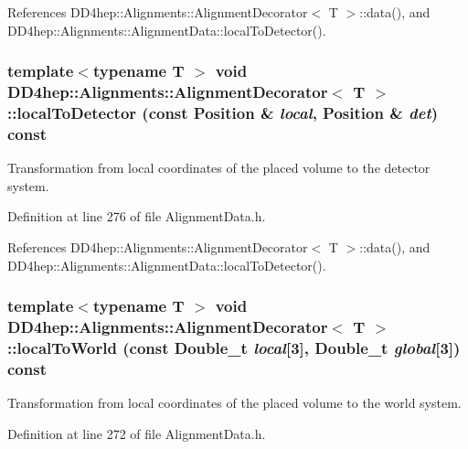 References DD4hep::Alignments::AlignmentDecorator$<$ T $>$::data(), and DD4hep::Alignments::AlignmentData::localToDetector().\hypertarget{class_d_d4hep_1_1_alignments_1_1_alignment_decorator_a1be4d8fa4b9ce399e5e73e0d6bce00d6}{
\subsubsection[{localToDetector}]{\setlength{\rightskip}{0pt plus 5cm}template$<$typename T $>$ void {\bf DD4hep::Alignments::AlignmentDecorator}$<$ {\bf T} $>$::localToDetector (const Position \& {\em local}, \/  Position \& {\em det}) const}}
\label{class_d_d4hep_1_1_alignments_1_1_alignment_decorator_a1be4d8fa4b9ce399e5e73e0d6bce00d6}


Transformation from local coordinates of the placed volume to the detector system. 

Definition at line 276 of file AlignmentData.h.

References DD4hep::Alignments::AlignmentDecorator$<$ T $>$::data(), and DD4hep::Alignments::AlignmentData::localToDetector().\hypertarget{class_d_d4hep_1_1_alignments_1_1_alignment_decorator_abd034c9893024823ceccda4994fdedac}{
\subsubsection[{localToWorld}]{\setlength{\rightskip}{0pt plus 5cm}template$<$typename T $>$ void {\bf DD4hep::Alignments::AlignmentDecorator}$<$ {\bf T} $>$::localToWorld (const Double\_\-t {\em local}\mbox{[}3\mbox{]}, \/  Double\_\-t {\em global}\mbox{[}3\mbox{]}) const}}
\label{class_d_d4hep_1_1_alignments_1_1_alignment_decorator_abd034c9893024823ceccda4994fdedac}


Transformation from local coordinates of the placed volume to the world system. 

Definition at line 272 of file AlignmentData.h.

